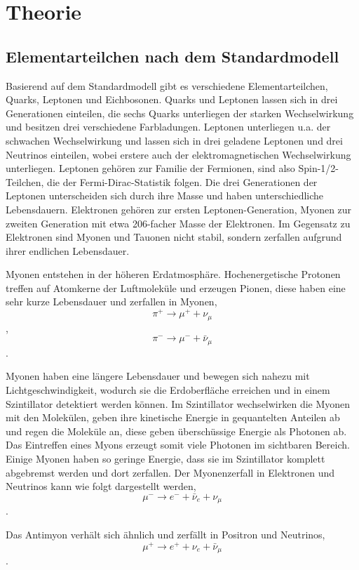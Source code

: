 \section{Theorie}

\cite{myon}

\subsection{Elementarteilchen nach dem Standardmodell}

Basierend auf dem Standardmodell gibt es verschiedene Elementarteilchen, Quarks, Leptonen und Eichbosonen. Quarks und Leptonen lassen sich in drei Generationen einteilen, die sechs Quarks unterliegen der starken Wechselwirkung und besitzen drei verschiedene Farbladungen. Leptonen unterliegen u.a. der schwachen Wechselwirkung und lassen sich in drei geladene Leptonen und drei Neutrinos einteilen, wobei erstere auch der elektromagnetischen Wechselwirkung unterliegen. Leptonen gehören zur Familie der Fermionen, sind also Spin-1/2-Teilchen, die der Fermi-Dirac-Statistik folgen. Die drei Generationen der Leptonen unterscheiden sich durch ihre Masse und haben unterschiedliche Lebensdauern. Elektronen gehören zur ersten Leptonen-Generation, Myonen zur zweiten Generation mit etwa 206-facher Masse der Elektronen. Im Gegensatz zu Elektronen sind Myonen und Tauonen nicht stabil, sondern zerfallen aufgrund ihrer endlichen Lebensdauer.

Myonen entstehen in der höheren Erdatmosphäre. Hochenergetische Protonen treffen auf Atomkerne der Luftmoleküle und erzeugen Pionen, diese haben eine sehr kurze Lebensdauer und zerfallen in Myonen, $$\pi^+ \rightarrow \mu^+ + \nu_\mu$$, $$\pi^- \rightarrow \mu^- + \bar{\nu}_\mu$$.

Myonen haben eine längere Lebensdauer und bewegen sich nahezu mit Lichtgeschwindigkeit, wodurch sie die Erdoberfläche erreichen und in einem Szintillator detektiert werden können. Im Szintillator wechselwirken die Myonen mit den Molekülen, geben ihre kinetische Energie in gequantelten Anteilen ab und regen die Moleküle an, diese geben überschüssige Energie als Photonen ab. Das Eintreffen eines Myons erzeugt somit viele Photonen im sichtbaren Bereich. Einige Myonen haben so geringe Energie, dass sie im Szintillator komplett abgebremst werden und dort zerfallen. Der Myonenzerfall in Elektronen und Neutrinos kann wie folgt dargestellt werden, $$\mu^- \rightarrow e^- + \bar{\nu}_e + \nu_\mu$$.

Das Antimyon verhält sich ähnlich und zerfällt in Positron und Neutrinos, $$\mu^+ \rightarrow e^+ + \nu_e + \bar{\nu}_\mu$$.

